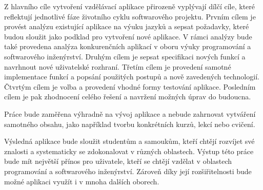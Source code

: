 Z hlavního cíle vytvoření vzdělávací aplikace přirozeně vyplývají dílčí cíle, které reflektují jednotlivé fáze životního cyklu softwarového projektu. Prvním cílem je provést analýzu existující aplikace na výuku jazyků a sepsat požadavky, které budou sloužit jako podklad pro vytvoření nové aplikace. V rámci analýzy bude také provedena analýza konkurenčních aplikací v oboru výuky programování a softwarového inženýrství. Druhým cílem je sepsat specifikaci nových funkcí a navrhnout nové uživatelské rozhraní. Třetím cílem je provedení samotné implementace funkcí a popsání použitých postupů a nově zavedených technologií. Čtvrtým cílem je volba a provedení vhodné formy testování aplikace. Posledním cílem je pak zhodnocení celého řešení a navržení možných úprav do budoucna.

Práce bude zaměřena výhradně na vývoj aplikace a nebude zahrnovat vytváření samotného obsahu, jako například tvorbu konkrétních kurzů, lekcí nebo cvičení.

Výsledná aplikace bude sloužit studentům a samoukům, kteří chtějí rozvíjet své znalosti a systematicky se zdokonalovat v různých oblastech. Výstup této práce bude mít největší přínos pro uživatele, kteří se chtějí vzdělat v oblastech programování a softwarového inženýrství. Zároveň díky její rozšiřitelnosti bude možné aplikaci využít i v mnoha dalších oborech.

